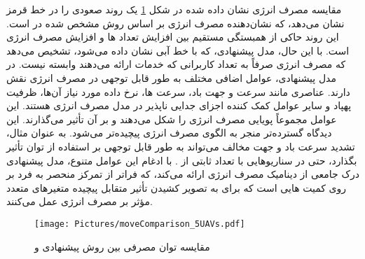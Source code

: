 مقایسه مصرف انرژی نشان ‌داده ‌شده در شکل \ref{fig:powercomp} یک روند صعودی را در خط قرمز نشان می‌دهد، که نشان‌دهنده مصرف انرژی بر اساس روش‌ مشخص شده در \cite{8892933} است. این روند حاکی از همبستگی مستقیم بین افزایش تعداد ها و افزایش مصرف انرژی است. با این حال، مدل پیشنهادی، که با خط آبی نشان داده می‌شود، تشخیص می‌دهد که مصرف انرژی صرفاً به تعداد کاربرانی که خدمات ارائه می‌دهند وابسته نیست. در مدل پیشنهادی، عوامل اضافی مختلف به طور قابل توجهی در مصرف انرژی نقش دارند. عناصری مانند سرعت و جهت باد، سرعت ها، نرخ داده مورد نیاز آن‌ها، ظرفیت پهپاد و سایر عوامل کمک کننده اجزای جدایی ناپذیر در مدل مصرف انرژی هستند. این عوامل مجموعاً پویایی مصرف انرژی را شکل می‌دهند و بر آن تأثیر می‌گذارند. این دیدگاه گسترده‌تر منجر به الگوی مصرف انرژی پیچیده‌تر می‌شود. به عنوان مثال، تشدید سرعت باد و جهت مخالف می‌تواند به طور قابل توجهی بر استفاده از توان تأثیر بگذارد، حتی در سناریوهایی با تعداد ثابتی از .
با ادغام این عوامل متنوع، مدل پیشنهادی درک جامعی از دینامیک مصرف انرژی ارائه می‌کند، که فراتر از تمرکز منحصر به فرد بر روی کمیت هایی است که برای به تصویر کشیدن تأثیر متقابل پیچیده متغیرهای متعدد مؤثر بر مصرف انرژی عمل می‌کنند.
\begin{figure}%
	\centering
	\texttt{[image: Pictures/moveComparison\_5UAVs.pdf]}
	\caption{مقایسه توان مصرفی بین روش پیشنهادی و \cite{8892933}}
	\label{fig:powercomp}
\end{figure}
\\